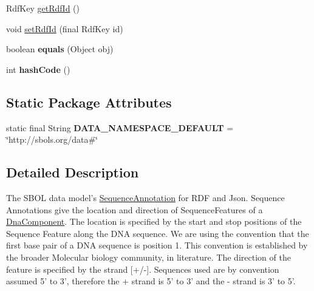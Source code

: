 \begin{DoxyCompactItemize}
RdfKey \hyperlink{classorg_1_1sbolstandard_1_1lib_s_b_o_lj_1_1_sequence_annotation_a98d34c30847c78a8922be878a2fa4d49}{getRdfId} ()
\item 
void \hyperlink{classorg_1_1sbolstandard_1_1lib_s_b_o_lj_1_1_sequence_annotation_afe8d2a1ced8871ba217ddf364366da99}{setRdfId} (final RdfKey id)
\item 
\hypertarget{classorg_1_1sbolstandard_1_1lib_s_b_o_lj_1_1_sequence_annotation_ae3ce8ca5a04e8966a9d2158aeeecfc16}{
boolean {\bfseries equals} (Object obj)}
\label{classorg_1_1sbolstandard_1_1lib_s_b_o_lj_1_1_sequence_annotation_ae3ce8ca5a04e8966a9d2158aeeecfc16}

\item 
\hypertarget{classorg_1_1sbolstandard_1_1lib_s_b_o_lj_1_1_sequence_annotation_a077e18fe97323c7194e2665ffc766399}{
int {\bfseries hashCode} ()}
\label{classorg_1_1sbolstandard_1_1lib_s_b_o_lj_1_1_sequence_annotation_a077e18fe97323c7194e2665ffc766399}

\end{DoxyCompactItemize}
\subsection*{Static Package Attributes}
\begin{DoxyCompactItemize}
\item 
\hypertarget{classorg_1_1sbolstandard_1_1lib_s_b_o_lj_1_1_sequence_annotation_a20b86331ad9418b0c6b737a193b5b051}{
static final String {\bfseries DATA\_\-NAMESPACE\_\-DEFAULT} = \char`\"{}http://sbols.org/data\#\char`\"{}}
\label{classorg_1_1sbolstandard_1_1lib_s_b_o_lj_1_1_sequence_annotation_a20b86331ad9418b0c6b737a193b5b051}

\end{DoxyCompactItemize}


\subsection{Detailed Description}
The SBOL data model's \hyperlink{classorg_1_1sbolstandard_1_1lib_s_b_o_lj_1_1_sequence_annotation}{SequenceAnnotation} for RDF and Json. Sequence Annotations give the location and direction of SequenceFeatures of a \hyperlink{classorg_1_1sbolstandard_1_1lib_s_b_o_lj_1_1_dna_component}{DnaComponent}. The location is specified by the start and stop positions of the Sequence Feature along the DNA sequence. We are using the convention that the first base pair of a DNA sequence is position 1. This convention is established by the broader Molecular biology community, in literature. The direction of the feature is specified by the strand \mbox{[}+/-\/\mbox{]}. Sequences used are by convention assumed 5' to 3', therefore the {\ttfamily +} strand is 5' to 3' and the {\ttfamily -\/} strand is 3' to 5'.

